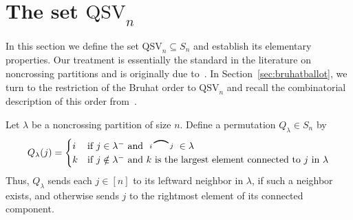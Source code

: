 \documentclass[submission]{FPSAC2024}
\newtheorem{prop}[equation]{Proposition}
\theoremstyle{definition}
\theoremstyle{remark}
\numberwithin{equation}{section}
\newcommand{\QSV}{\mathrm{QSV}}
\newcommand{\edge}[2]{\tikz[scale = 0.75, baseline = -0.2cm]{
\draw (0.1, 0) node[inner sep = 0ex] (a) {};
\node[left, xshift = 0.1cm, yshift = -0.1cm] at (a) {$\scriptstyle #1$};
\draw (0.9, 0)  node[inner sep = 0ex] (b) {};
\node[right, xshift = -0.1cm, yshift = -0.1cm] at (b) {$\scriptstyle #2$};
\draw[thick] (a) to[out = 35, in = 145] (b);}}
\begin{document}
%
%

\section{The set $\QSV_{n}$}
\label{sec:QSV}

In this section we define the set $\QSV_{n} \subseteq S_n$ and establish its elementary properties.  Our treatment is essentially the standard  in the literature on noncrossing partitions and is originally due to~\cite{Baine}.  In Section~\ref{sec:bruhatballot}, we turn to the restriction of the Bruhat order to $\QSV_{n}$ and recall the combinatorial description of this order from~\cite{GW16}. 

Let $\lambda$ be a noncrossing partition of size $n$.
Define a permutation $Q_{\lambda} \in S_{n}$ by 
\[
Q_{\lambda}(j) = \begin{cases} i & \text{if $j \in \lambda^{-}$ and $ \edge{i}{j} \in \lambda$} \\
k & \text{if $j \notin \lambda^{-}$ and $k$ is the largest element connected to $j$ in $\lambda$}
\end{cases}
\]
Thus, $Q_{\lambda}$ sends each $j \in [n]$ to its leftward neighbor in $\lambda$, if such a neighbor exists, and otherwise sends $j$ to the rightmost element of its connected component.  
\end{document}
